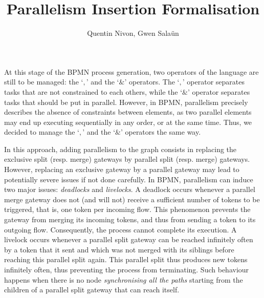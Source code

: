\documentclass{article}
\title{Parallelism Insertion Formalisation}
\author{Quentin Nivon, Gwen Sala{\"u}n}
\newcommand{\comaop}{`$,$' }
\newcommand{\parop}{`$\&$' }
\begin{document}
	\maketitle
	
	At this stage of the BPMN process generation, two operators of the language are still to be managed: the \comaop and the \parop operators.
	The \comaop operator separates tasks that are not constrained to each others, while the \parop operator separates tasks that should be put in parallel.
	However, in BPMN, parallelism precisely describes the absence of constraints between elements, as two parallel elements may end up executing sequentially in any order, or at the same time.
	Thus, we decided to manage the \comaop and the \parop operators the same way.
	
	In this approach, adding parallelism to the graph consists in replacing the exclusive split (resp. merge) gateways by parallel split (resp. merge) gateways.
	However, replacing an exclusive gateway by a parallel gateway may lead to potentially severe issues if not done carefully.
	In BPMN, parallelism can induce two major issues: \textit{deadlocks} and \textit{livelocks}.
	A deadlock occurs whenever a parallel merge gateway does not (and will not) receive a sufficient number of tokens to be triggered, that is, one token per incoming flow.
	This phenomenon prevents the gateway from merging its incoming tokens, and thus from sending a token to its outgoing flow.
	Consequently, the process cannot complete its execution.
	A livelock occurs whenever a parallel split gateway can be reached infinitely often by a token that it sent and which was not merged with its siblings before reaching this parallel split again.
	This parallel split thus produces new tokens infinitely often, thus preventing the process from terminating.
	Such behaviour happens when there is no node \textit{synchronising all the paths} starting from the children of a parallel split gateway that can reach itself.
	
\end{document}
